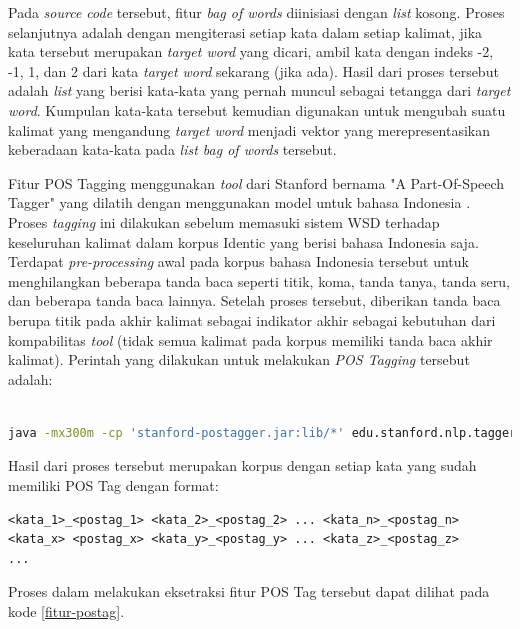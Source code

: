 Pada \textit{source code} tersebut, fitur \textit{bag of words} diinisiasi dengan \textit{list} kosong. Proses selanjutnya adalah dengan mengiterasi setiap kata dalam setiap kalimat, jika kata tersebut merupakan \textit{target word} yang dicari, ambil kata dengan indeks -2, -1, 1, dan 2 dari kata \textit{target word} sekarang (jika ada). Hasil dari proses tersebut adalah \textit{list} yang berisi kata-kata yang pernah muncul sebagai tetangga dari \textit{target word}. Kumpulan kata-kata tersebut kemudian digunakan untuk mengubah suatu kalimat yang mengandung \textit{target word} menjadi vektor yang merepresentasikan keberadaan kata-kata pada \textit{list bag of words} tersebut.

Fitur POS Tagging menggunakan \textit{tool} dari Stanford bernama "A Part-Of-Speech Tagger" yang dilatih dengan menggunakan model untuk bahasa Indonesia \citep{dinakaramani2014designing}. Proses \textit{tagging} ini dilakukan sebelum memasuki sistem WSD terhadap keseluruhan kalimat dalam korpus Identic yang berisi bahasa Indonesia saja. Terdapat \textit{pre-processing} awal pada korpus bahasa Indonesia tersebut untuk menghilangkan beberapa tanda baca seperti titik, koma, tanda tanya, tanda seru, dan beberapa tanda baca lainnya. Setelah proses tersebut, diberikan tanda baca berupa titik pada akhir kalimat sebagai indikator akhir sebagai kebutuhan dari kompabilitas \textit{tool} (tidak semua kalimat pada korpus memiliki tanda baca akhir kalimat). Perintah yang dilakukan untuk melakukan \textit{POS Tagging} tersebut adalah:

\begin{lstlisting}[language=bash,caption={Stanford POS Tagger}, label={stanford-pos-tagger}]

java -mx300m -cp 'stanford-postagger.jar:lib/*' edu.stanford.nlp.tagger.maxent.MaxentTagger -model <model_bahasa_indonesia> -textFile <korpus_bahasa_indonesia>

\end{lstlisting}

Hasil dari proses tersebut merupakan korpus dengan setiap kata yang sudah memiliki POS Tag dengan format:

\begin{lstlisting}[backgroundcolor = \color{white}]
<kata_1>_<postag_1> <kata_2>_<postag_2> ... <kata_n>_<postag_n>
<kata_x> <postag_x> <kata_y>_<postag_y> ... <kata_z>_<postag_z>
...
\end{lstlisting}

Proses dalam melakukan eksetraksi fitur POS Tag tersebut dapat dilihat pada kode \ref{fitur-postag}.

